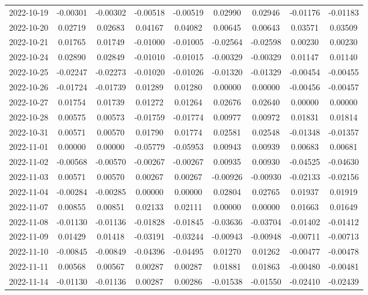 {\begin{footnotesize}
\begin{longtable}{lcccccccc}
2022-10-19 & -0.00301 & -0.00302 & -0.00518 & -0.00519 & 0.02990 & 0.02946 & -0.01176 & -0.01183 \\
2022-10-20 & 0.02719 & 0.02683 & 0.04167 & 0.04082 & 0.00645 & 0.00643 & 0.03571 & 0.03509 \\
2022-10-21 & 0.01765 & 0.01749 & -0.01000 & -0.01005 & -0.02564 & -0.02598 & 0.00230 & 0.00230 \\
2022-10-24 & 0.02890 & 0.02849 & -0.01010 & -0.01015 & -0.00329 & -0.00329 & 0.01147 & 0.01140 \\
2022-10-25 & -0.02247 & -0.02273 & -0.01020 & -0.01026 & -0.01320 & -0.01329 & -0.00454 & -0.00455 \\
2022-10-26 & -0.01724 & -0.01739 & 0.01289 & 0.01280 & 0.00000 & 0.00000 & -0.00456 & -0.00457 \\
2022-10-27 & 0.01754 & 0.01739 & 0.01272 & 0.01264 & 0.02676 & 0.02640 & 0.00000 & 0.00000 \\
2022-10-28 & 0.00575 & 0.00573 & -0.01759 & -0.01774 & 0.00977 & 0.00972 & 0.01831 & 0.01814 \\
2022-10-31 & 0.00571 & 0.00570 & 0.01790 & 0.01774 & 0.02581 & 0.02548 & -0.01348 & -0.01357 \\
2022-11-01 & 0.00000 & 0.00000 & -0.05779 & -0.05953 & 0.00943 & 0.00939 & 0.00683 & 0.00681 \\
2022-11-02 & -0.00568 & -0.00570 & -0.00267 & -0.00267 & 0.00935 & 0.00930 & -0.04525 & -0.04630 \\
2022-11-03 & 0.00571 & 0.00570 & 0.00267 & 0.00267 & -0.00926 & -0.00930 & -0.02133 & -0.02156 \\
2022-11-04 & -0.00284 & -0.00285 & 0.00000 & 0.00000 & 0.02804 & 0.02765 & 0.01937 & 0.01919 \\
2022-11-07 & 0.00855 & 0.00851 & 0.02133 & 0.02111 & 0.00000 & 0.00000 & 0.01663 & 0.01649 \\
2022-11-08 & -0.01130 & -0.01136 & -0.01828 & -0.01845 & -0.03636 & -0.03704 & -0.01402 & -0.01412 \\
2022-11-09 & 0.01429 & 0.01418 & -0.03191 & -0.03244 & -0.00943 & -0.00948 & -0.00711 & -0.00713 \\
2022-11-10 & -0.00845 & -0.00849 & -0.04396 & -0.04495 & 0.01270 & 0.01262 & -0.00477 & -0.00478 \\
2022-11-11 & 0.00568 & 0.00567 & 0.00287 & 0.00287 & 0.01881 & 0.01863 & -0.00480 & -0.00481 \\
2022-11-14 & -0.01130 & -0.01136 & 0.00287 & 0.00286 & -0.01538 & -0.01550 & -0.02410 & -0.02439 \\

\end{longtable}
\end{footnotesize}}
